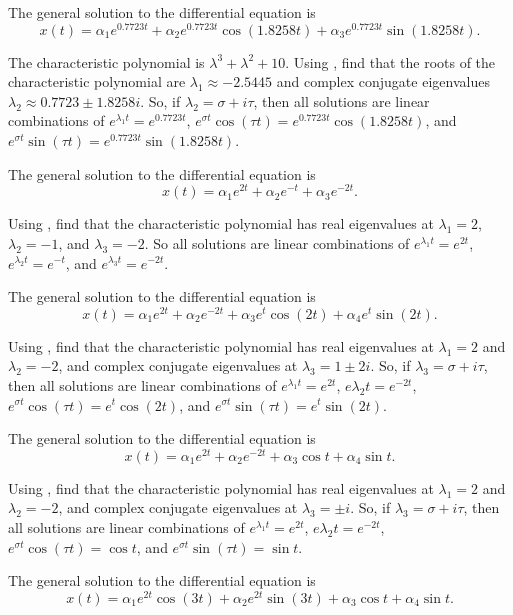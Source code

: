 \documentclass{ximera}
\begin{document}
 \ans The general solution to the differential equation is
\[
x(t) = \alpha_1e^{0.7723t} + \alpha_2e^{0.7723t}\cos(1.8258t) +
\alpha_3e^{0.7723t}\sin(1.8258t).
\]

\soln The characteristic polynomial is $\lambda^3+\lambda^2+10$.  Using 
\Matlab, find that the roots of the characteristic polynomial are 
$\lambda_1 \approx  -2.5445$ and  complex conjugate eigenvalues 
$\lambda_2 \approx 0.7723 \pm 1.8258i$.  So, if $\lambda_2 = \sigma + i\tau$,
then all solutions are linear combinations of $e^{\lambda_1 t}=e^{0.7723t}$,
$e^{\sigma t}\cos(\tau t) = e^{0.7723t}\cos(1.8258t)$, and
$e^{\sigma t}\sin(\tau t) = e^{0.7723t}\sin(1.8258t)$.


 \ans The general solution to the differential equation is
\[
x(t) = \alpha_1e^{2t} + \alpha_2e^{-t} + \alpha_3e^{-2t}.
\]

\soln Using \Matlab, find that the characteristic polynomial has real
eigenvalues at $\lambda_1 = 2$, $\lambda_2 = -1$, and $\lambda_3 = -2$.  So
all solutions are linear combinations of $e^{\lambda_1 t} = e^{2t}$,
$e^{\lambda_2 t} = e^{-t}$, and $e^{\lambda_3 t} = e^{-2t}$.

 \ans The general solution to the differential equation is
\[
x(t) = \alpha_1e^{2t} + \alpha_2e^{-2t} + \alpha_3e^t\cos(2t) +
\alpha_4e^t\sin(2t).
\]

\soln Using \Matlab, find that the characteristic polynomial has real
eigenvalues at $\lambda_1 = 2$ and $\lambda_2 = -2$, and complex
conjugate eigenvalues at $\lambda_3 = 1 \pm 2i$.  So, if $\lambda_3 =
\sigma + i\tau$, then all solutions are linear combinations of
$e^{\lambda_1 t} = e^{2t}$, $e{\lambda_2 t} = e^{-2t}$,
$e^{\sigma t}\cos(\tau t) = e^t\cos(2t)$, and
$e^{\sigma t}\sin(\tau t) = e^t\sin(2t)$.

 \ans The general solution to the differential equation is
\[
x(t) = \alpha_1e^{2t} + \alpha_2e^{-2t} + \alpha_3\cos t +
\alpha_4\sin t.
\]

\soln Using \Matlab, find that the characteristic polynomial has real
eigenvalues at $\lambda_1 = 2$ and $\lambda_2 = -2$, and complex
conjugate eigenvalues at $\lambda_3 = \pm i$.  So, if $\lambda_3 =
\sigma + i\tau$, then all solutions are linear combinations of
$e^{\lambda_1 t} = e^{2t}$, $e{\lambda_2 t} = e^{-2t}$,
$e^{\sigma t}\cos(\tau t) = \cos t$, and $e^{\sigma t}\sin(\tau t) = \sin t$.

 \ans The general solution to the differential equation is
\[
x(t) = \alpha_1e^{2t}\cos(3t) + \alpha_2e^{2t}\sin(3t) +
\alpha_3\cos t + \alpha_4\sin t.
\]
\end{document}
